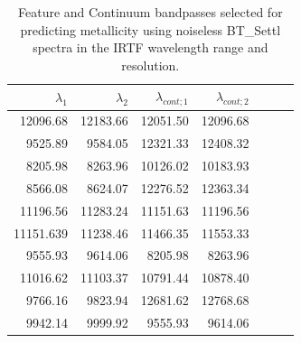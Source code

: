 \begin{table}
\begin{center}
\begin{tabular}{rrrrrrr}
  \hline
  $\lambda_1$ & $\lambda_2$ & $\lambda_{cont;1}$ & $\lambda_{cont;2} $ \\ 
  \hline
     12096.68 & 12183.66  & 12051.50 & 12096.68 \\
     9525.89 & 9584.05 	  & 12321.33 & 12408.32 \\
     8205.98 & 8263.96 	  & 10126.02 & 10183.93 \\
     8566.08 & 8624.07 	  & 12276.52 & 12363.34 \\
     11196.56 & 11283.24  & 11151.63 & 11196.56 \\
     11151.639 & 11238.46 & 11466.35 & 11553.33 \\
     9555.93 & 9614.06 	  & 8205.98  & 8263.96 \\
     11016.62 & 11103.37  & 10791.44 & 10878.40 \\
     9766.16 & 9823.94 	  & 12681.62 & 12768.68 \\
     9942.14 & 9999.92   & 9555.93  & 9614.06 \\
\hline
\end{tabular}
\caption {Feature and Continuum bandpasses selected for predicting
  metallicity using noiseless BT\_Settl spectra in the IRTF wavelength
  range and resolution.} \label{tab:irtf-met-noiseless}
\end{center}
\end{table}

